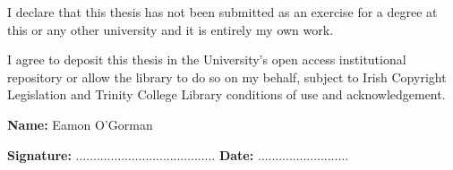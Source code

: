 

\begin{declaration}      

I declare that this thesis has not been submitted as an exercise for a degree at this or
any other university and it is entirely my own work.

\vspace{10mm}

I agree to deposit this thesis in the University's open access institutional repository or
allow the library to do so on my behalf, subject to Irish Copyright Legislation and
Trinity College Library conditions of use and acknowledgement.

\vspace{30mm}

\textbf{Name:} Eamon O'Gorman	

\vspace{15mm}

\textbf{Signature:}  ........................................		\textbf{Date:}  ..........................



\end{declaration}

\newpage
\thispagestyle{empty}
\mbox{}



